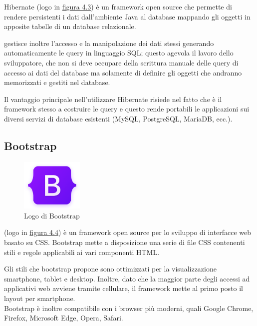 \noindent Hibernate (logo in {\hyperref[fig:hibernate]{figura 4.3}}) è un framework open source che permette di  rendere persistenti i dati dall'ambiente Java al database mappando gli oggetti in apposite tabelle di un database relazionale.

\setlength{\parskip}{3ex}

\ap{{[b]}} gestisce inoltre l'accesso e la manipolazione dei dati stessi generando automaticamente le query in linguaggio SQL; questo agevola il lavoro dello sviluppatore, che non si deve occupare della scrittura manuale delle query di accesso ai dati del database ma solamente di definire gli oggetti che andranno memorizzati e gestiti nel database.

\setlength{\parskip}{2ex}

\noindent Il vantaggio principale nell'utilizzare Hibernate risiede nel fatto che è il framework stesso a costruire le query e questo rende portabili le applicazioni sui diversi servizi di database esistenti (MySQL, PostgreSQL, MariaDB, ecc.).

\subsection{Bootstrap}

\begin{figure}[!h]
	\centering
	\includegraphics[width=3cm]{../images/Bootstrap-logo.png}
	\caption{Logo di Bootstrap}
	\label{fig:bootstrap}
\end{figure}

\ap{{[b]}} (logo in {\hyperref[fig:bootstrap]{figura 4.4}}) è un framework open source per lo sviluppo di interfacce web basato su CSS. Bootstrap mette a disposizione una serie di file CSS contenenti stili e regole applicabili ai vari componenti HTML.

\setlength{\parskip}{3ex}

\noindent Gli stili che bootstrap propone sono ottimizzati per la visualizzazione smartphone, tablet e desktop. Inoltre, dato che la maggior parte degli accessi ad applicativi web avviene tramite cellulare, il framework mette al primo posto il layout per smartphone.\\
Bootstrap è inoltre compatibile con i browser più moderni, quali Google Chrome, Firefox, Microsoft Edge, Opera, Safari.

